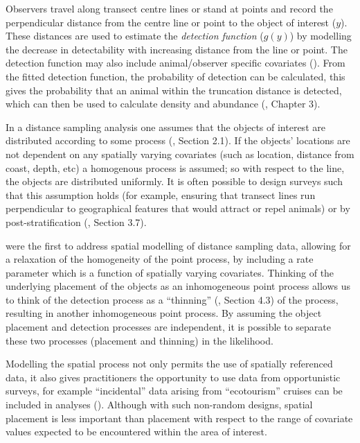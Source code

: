 \documentclass[a4paper,12pt]{article}
\begin{document}
Observers travel along transect centre lines or stand at points and record the perpendicular distance from the centre line or point to the object of interest ($y$). These distances are used to estimate the \textit{detection function} ($g(y)$) by modelling the decrease in detectability with increasing distance from the line or point. The detection function may also include animal/observer specific covariates (\cite{Marques:2007vm}). From the fitted detection function, the probability of detection can be calculated, this gives the probability that an animal within the truncation distance is detected, which can then be used to calculate density and abundance (\cite{Buckland:2001vm}, Chapter 3).

In a distance sampling analysis one assumes that the objects of interest are distributed according to some process (\cite{Buckland:2001vm}, Section 2.1). If the objects' locations are not dependent on any spatially varying covariates (such as location, distance from coast, depth, etc) a homogenous process is assumed; so with respect to the line, the objects are distributed uniformly. It is often possible to design surveys such that this assumption holds (for example, ensuring that transect lines run perpendicular to geographical features that would attract or repel animals) or by post-stratification (\cite{Buckland:2001vm}, Section 3.7). 

\cite{Hedley:2004et} were the first to address spatial modelling of distance sampling data, allowing for a relaxation of the homogeneity of the point process, by including a rate parameter which is a function of spatially varying covariates. Thinking of the underlying placement of the objects as an inhomogeneous point process allows us to think of the detection process as a ``thinning'' (\cite{cox1980point}, Section 4.3) of the process, resulting in another inhomogeneous point process. By assuming the object placement and detection processes are independent, it is possible to separate these two processes (placement and thinning) in the likelihood.

Modelling the spatial process not only permits the use of spatially referenced data, it also gives practitioners the opportunity to use data from opportunistic surveys, for example ``incidental'' data arising from ``ecotourism'' cruises can be included in analyses (\cite{Williams:2006tz}). Although with such non-random designs, spatial placement is less important than placement with respect to the range of covariate values expected to be encountered within the area of interest.
\end{document}
